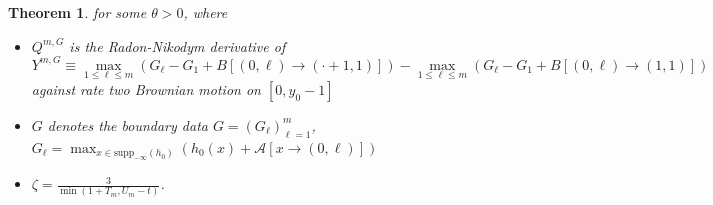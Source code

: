 \documentclass[11pt, reqno]{amsart}
\numberwithin{equation}{section}
\newcounter{dummy} \numberwithin{dummy}{section}
\newtheorem{theorem}[dummy]{Theorem}
\begin{document}
\begin{theorem}
for some $\theta > 0$, where 
\begin{itemize}
\item[1.] $Q^{m, G}$ is the Radon-Nikodym  derivative of 
\begin{equation*}
Y^{m, G}\equiv \displaystyle\max_{1\le \ell \le m}(G_{\ell} -G_1 + B[(0,\ell)\to (\cdot+1,1)])-\displaystyle\max_{1\le \ell \le m}(G_{\ell} -G_1 + B[(0,\ell)\to (1,1)])
\end{equation*}
against rate two Brownian motion on $[0, y_0-1]$
\item[2.] $G$ denotes the boundary data $G = (G_{\ell})_{\ell=1}^m$, $G_\ell = \displaystyle\max_{x\in \mathrm{supp}_{-\infty}(h_0)}(h_0(x)+\mathcal{A}[x\to (0,\ell)])$
    \item[3.]  $\zeta = \frac{3}{\min(1+T_m, U_m-t)}$.
\end{itemize}

\end{theorem}
\end{document}

